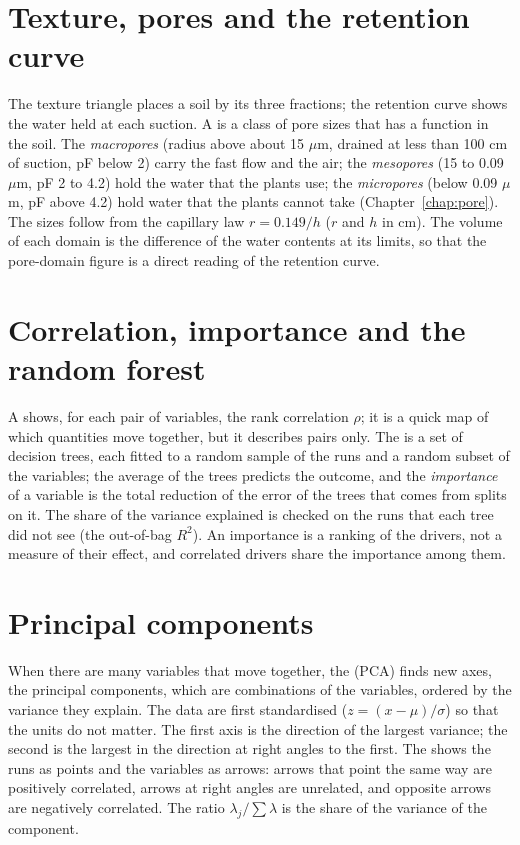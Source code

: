 \section{Texture, pores and the retention curve}
The texture triangle places a soil by its three fractions; the retention curve shows the water held at each suction. A  is a class of pore sizes that has a function in the soil. The \emph{macropores} (radius above about 15 $\mu$m, drained at less than 100 cm of suction, pF below 2) carry the fast flow and the air; the \emph{mesopores} (15 to 0.09 $\mu$m, pF 2 to 4.2) hold the water that the plants use; the \emph{micropores} (below 0.09 $\mu$m, pF above 4.2) hold water that the plants cannot take (Chapter~\ref{chap:pore}). The sizes follow from the capillary law $r=0.149/h$ ($r$ and $h$ in cm). The volume of each domain is the difference of the water contents at its limits, so that the pore-domain figure is a direct reading of the retention curve.

\section{Correlation, importance and the random forest}
A  shows, for each pair of variables, the rank correlation $\rho$; it is a quick map of which quantities move together, but it describes pairs only. The  is a set of decision trees, each fitted to a random sample of the runs and a random subset of the variables; the average of the trees predicts the outcome, and the \emph{importance} of a variable is the total reduction of the error of the trees that comes from splits on it. The share of the variance explained is checked on the runs that each tree did not see (the out-of-bag $R^2$). An importance is a ranking of the drivers, not a measure of their effect, and correlated drivers share the importance among them.

\section{Principal components}
When there are many variables that move together, the  (PCA) finds new axes, the principal components, which are combinations of the variables, ordered by the variance they explain. The data are first standardised ($z=(x-\mu)/\sigma$) so that the units do not matter. The first axis is the direction of the largest variance; the second is the largest in the direction at right angles to the first. The  shows the runs as points and the variables as arrows: arrows that point the same way are positively correlated, arrows at right angles are unrelated, and opposite arrows are negatively correlated. The ratio $\lambda_j/\sum\lambda$ is the share of the variance of the component.

